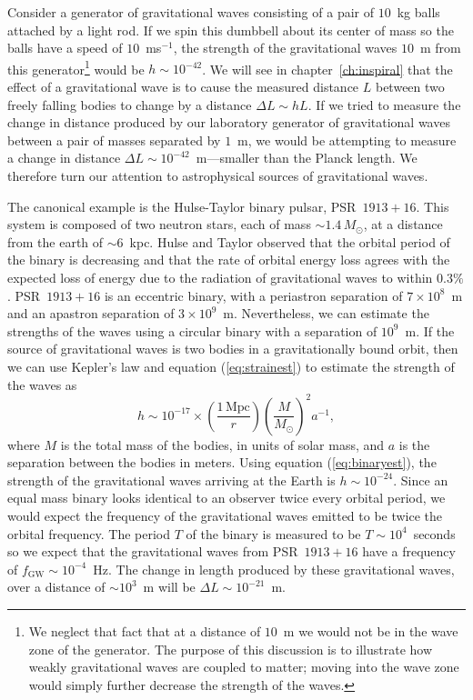 Consider a generator of gravitational waves consisting of a pair of $10$~kg
balls attached by a light rod. If we spin this dumbbell about its center of
mass so the balls have a speed of $10$~ms$^{-1}$,  the strength of the
gravitational waves $10$~m from this generator\footnote{We neglect that fact
that at a distance of $10$~m we would not be in the wave zone of the
generator. The purpose of this discussion is to illustrate how weakly
gravitational waves are coupled to matter; moving into the wave zone would
simply further decrease the strength of the waves.} would be $h \sim
10^{-42}$.  We will see in chapter~\ref{ch:inspiral} that the effect of a
gravitational wave is to cause the measured distance $L$ between two freely
falling bodies to change by a distance $\Delta L \sim h L$. If we
tried to measure the change in distance produced by our laboratory generator
of gravitational waves between a pair of masses separated by $1$~m, we would
be attempting to measure a change in distance $\Delta L \sim
10^{-42}$~m---smaller than the Planck length.  We therefore turn our
attention to astrophysical sources of gravitational waves.

The canonical example is the Hulse-Taylor binary pulsar,
PSR~$1913+16$\cite{1975ApJ...195L..51H}. This system is composed of two
neutron stars, each of mass $\sim 1.4\,M_\odot$, at a distance from the earth
of $\sim 6$~kpc. Hulse and Taylor observed that the orbital period of the
binary is decreasing and that the rate of orbital energy loss agrees with the
expected loss of energy due to the radiation of gravitational waves to within
$0.3\%$\cite{Taylor:1982,Taylor:1989}. PSR~$1913+16$ is an eccentric binary,
with a periastron separation of $7\times10^{8}$~m and an apastron separation
of $3\times10^{9}$~m. Nevertheless, we can estimate the strengths of the waves
using a circular binary with a separation of $10^{9}$~m.  If the source of
gravitational waves is two bodies in a gravitationally bound orbit, then we
can use Kepler's law and equation (\ref{eq:strainest}) to estimate the
strength of the waves as
\begin{equation}
h \sim 10^{-17} \times \left(\frac{1\,\mathrm{Mpc}}{r}\right)
\left(\frac{M}{M_\odot}\right)^2 a^{-1},
\label{eq:binaryest}
\end{equation}
where $M$ is the total mass of the bodies, in units of solar mass, and $a$ is
the separation between the bodies in meters.
Using equation (\ref{eq:binaryest}), the strength of the gravitational waves
arriving at the Earth is $h \sim 10^{-24}$. Since an equal mass binary looks
identical to an observer twice every orbital period, we would expect the
frequency of the gravitational waves emitted to be twice the orbital
frequency. The period $T$ of the binary is measured to be $T\sim 10^4$~seconds
so we expect that the gravitational waves from PSR~$1913+16$ have a frequency
of $f_\mathrm{GW} \sim 10^{-4}$~Hz.  The change in length produced by these
gravitational waves, over a distance of $\sim 10^3$~m will be $\Delta L \sim
10^{-21}$~m.


